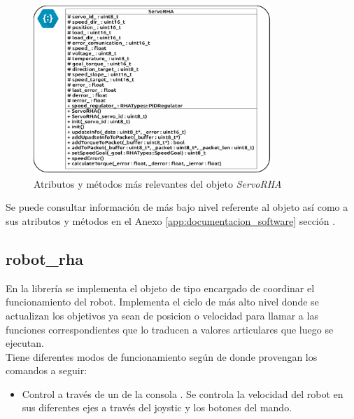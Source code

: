         \begin{figure}[H]
            \centering
            \includegraphics[width=0.8\textwidth]{figuras/Imagenes_SW/class_diagram_SRHA.jpg}
            \caption{Atributos y métodos más relevantes del objeto \textit{ServoRHA}}
            \label{fig:SW:class_diagram_SRHA}
        \end{figure}

        Se puede consultar información de más bajo nivel referente al objeto  así como a sus atributos y métodos en el Anexo \ref{app:documentacion_software} sección \completar.

    \subsection{robot\_rha} \label{subsec:SW:lib:robot_rha}
        En la librería  se implementa el objeto de tipo  encargado de coordinar el funcionamiento del robot. Implementa el ciclo de más alto nivel donde se actualizan los objetivos ya sean de posicion o velocidad para llamar a las funciones correspondientes que lo traducen a valores articulares que luego se ejecutan.
        \\

        Tiene diferentes modos de funcionamiento según de donde provengan los comandos a seguir:
        \begin{itemize}
            \item Control a través de un  de la consola . Se controla la velocidad del robot en sus diferentes ejes a través del joystic y los botones del mando.

        \end{itemize}

